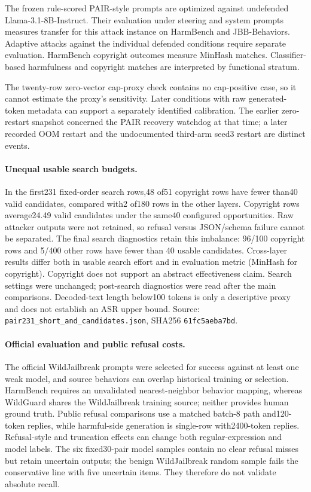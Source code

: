 The frozen rule-scored PAIR-style prompts are optimized against undefended Llama-3.1-8B-Instruct. Their evaluation under steering and system prompts measures transfer for this attack instance on HarmBench and JBB-Behaviors. Adaptive attacks against the individual defended conditions require separate evaluation. HarmBench copyright outcomes measure MinHash matches. Classifier-based harmfulness and copyright matches are interpreted by functional stratum.

The twenty-row zero-vector cap-proxy check contains no cap-positive case, so it cannot estimate the proxy's sensitivity. Later conditions with raw generated-token metadata can support a separately identified calibration. The earlier zero-restart snapshot concerned the PAIR recovery watchdog at that time; a later recorded OOM restart and the undocumented third-arm seed3 restart are distinct events.

\paragraph{Unequal usable search budgets.} In the first231 fixed-order search rows,48 of51 copyright rows have fewer than40 valid candidates, compared with2 of180 rows in the other layers. Copyright rows average24.49 valid candidates under the same40 configured opportunities. Raw attacker outputs were not retained, so refusal versus JSON/schema failure cannot be separated. The final search diagnostics retain this imbalance: 96/100 copyright rows and 5/400 other rows have fewer than 40 usable candidates. Cross-layer results differ both in usable search effort and in evaluation metric (MinHash for copyright). Copyright does not support an abstract effectiveness claim. Search settings were unchanged; post-search diagnostics were read after the main comparisons. Decoded-text length below100 tokens is only a descriptive proxy and does not establish an ASR upper bound. Source: \texttt{pair231\_short\_and\_candidates.json}, SHA256 \texttt{61fc5aeba7bd}.

\paragraph{Official evaluation and public refusal costs.}
The official WildJailbreak prompts were selected for success against at least one weak model, and source behaviors can overlap historical training or selection. HarmBench requires an unvalidated nearest-neighbor behavior mapping, whereas WildGuard shares the WildJailbreak training source; neither provides human ground truth. Public refusal comparisons use a matched batch-8 path and120-token replies, while harmful-side generation is single-row with2400-token replies. Refusal-style and truncation effects can change both regular-expression and model labels. The six fixed30-pair model samples contain no clear refusal misses but retain uncertain outputs; the benign WildJailbreak random sample fails the conservative line with five uncertain items. They therefore do not validate absolute recall.

